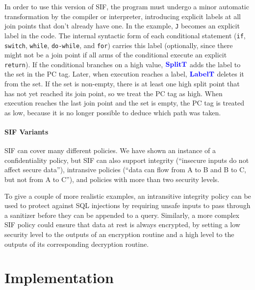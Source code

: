 In order to use this version of SIF, the program must undergo a minor automatic transformation
by the compiler or interpreter, introducing
explicit labels at all join points that don't already have one. 
In the example, {\tt J} becomes an explicit label in the code. 
The internal syntactic form of each conditional statement
({\tt if}, {\tt switch}, {\tt while}, {\tt do-while}, and {\tt for})
carries this label (optionally, since there might not be a join point if all arms of the
conditional execute an explicit {\tt return}).
If the conditional branches on a high value, \(\color{blue} \mathbf{SplitT}\) adds the label to the set
in the PC tag. Later, when execution reaches a label, \(\color{blue} \mathbf{LabelT}\) deletes it from the
set. If the set is non-empty, there is at least one high split point that has not
yet reached its join point, so we treat the PC tag as high. When execution reaches the
last join point and the set is empty, the PC tag is treated as low, because it is no longer
possible to deduce which path was taken. 

\paragraph*{SIF Variants}

SIF can cover many different policies. We have shown an instance of
a confidentiality policy, but SIF can also support integrity
(``insecure inputs do not affect secure data''), intransive policies
(``data can flow from A to B and B to C, but not from A to C''), and policies with
more than two security levels.

To give a couple of more realistic examples, an intransitive integrity policy
can be used to protect against SQL injections by requiring unsafe inputs to pass through a sanitizer
before they can be appended to a query. Similarly, a more complex SIF policy could ensure that
data at rest is always encrypted, by setting a low security level to the outputs of an encryption
routine and a high level to the outputs of its corresponding decryption routine.

\section{Implementation}
\label{ch4:sec:implementation}

